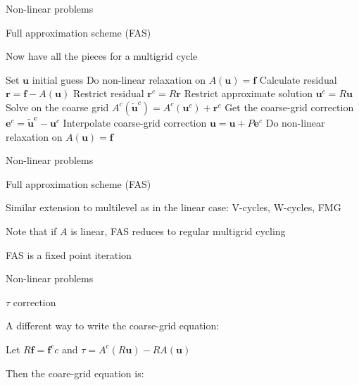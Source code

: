 \documentclass[18pt,xcolor=table]{beamer}
\begin{document}
\begin{frame}{Non-linear problems}
\begin{block}{Full approximation scheme (FAS)}
\bit
\item Now have all the pieces for a multigrid cycle
\begin{algorithm}[H]
\caption{Full approximation scheme (FAS) two-grid cycle}
\begin{algorithmic}
\State Set $\mathbf{u}$ initial guess
\State Do non-linear relaxation on $A(\mathbf{u}) = \mathbf{f}$
\State Calculate residual $\mathbf{r} = \mathbf{f} - A(\mathbf{u})$
\State Restrict residual $\mathbf{r}^c = R\mathbf{r}$
\State Restrict approximate solution $\mathbf{u}^c = R\mathbf{u}$
\State Solve on the coarse grid $A^c(\mathbf{\tilde{u}}^c) = A^c(\mathbf{u}^c) + \mathbf{r}^c$
\State Get the coarse-grid correction $\mathbf{e}^c = \mathbf{\tilde{u}^c} - \mathbf{u}^c$
\State Interpolate coarse-grid correction $\mathbf{u} = \mathbf{u} + P\mathbf{e}^c$
\State Do non-linear relaxation on $A(\mathbf{u}) = \mathbf{f}$
\end{algorithmic}
\end{algorithm}
\eit
\end{block}
\end{frame}


\begin{frame}{Non-linear problems}
\begin{block}{Full approximation scheme (FAS)}
\bit
\item Similar extension to multilevel as in the linear case: V-cycles, W-cycles, FMG
\item Note that if $A$ is linear, FAS reduces to regular multigrid cycling
\item FAS is a fixed point iteration 
\eit
\end{block}
\end{frame}

\begin{frame}{Non-linear problems}
\begin{block}{$\tau$ correction}
\bit
\item A different way to write the coarse-grid equation:
\item Let $R\mathbf{f} = \mathbf{f}^cc$ and $\tau = A^c(R\mathbf{u}) - RA(\mathbf{u})$
\item Then the coare-grid equation is:
\eit
\end{block}
\end{frame}
\end{document}
